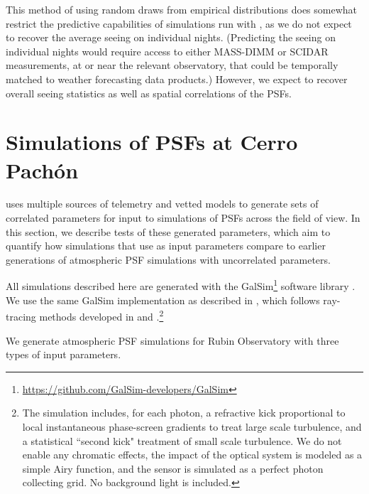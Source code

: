 \documentclass[twocolumn]{aastex631}
\begin{document}
This method of using random draws from empirical distributions does somewhat restrict the predictive capabilities of simulations run with \psfws, as we do not expect to recover the average seeing on individual nights.
(Predicting the seeing on individual nights would require access to either MASS-DIMM or SCIDAR measurements, at or near the relevant observatory, that could be temporally matched to weather forecasting data products.)
However, we expect to recover overall seeing statistics as well as spatial correlations of the PSFs.  

\section{Simulations of PSFs at Cerro Pach\'on}\label{sec:imsiminputs}
\psfws uses multiple sources of telemetry and vetted models to generate sets of correlated parameters for input to simulations of PSFs across the field of view.
In this section, we describe tests of these generated parameters, which aim to quantify how simulations that use as input \psfws parameters compare to earlier generations of atmospheric PSF simulations with uncorrelated parameters. 

All simulations described here are generated with the GalSim\footnote{\url{https://github.com/GalSim-developers/GalSim}} software library \citep{rowe_galsim_2015}.
We use the same GalSim implementation as described in \dcii, which follows ray-tracing methods developed in \cite{jee_toward_2011} and \cite{peterson_simulation_2015}.\footnote{The simulation includes, for each photon, a refractive kick proportional to local instantaneous phase-screen gradients to treat large scale turbulence, and a statistical ``second kick" treatment of small scale turbulence.  We do not enable any chromatic effects, the impact of the optical system is modeled as a simple Airy function, and the sensor is simulated as a perfect photon collecting grid.  No background light is included.}

We generate atmospheric PSF simulations for Rubin Observatory with three types of input parameters.
\end{document}
